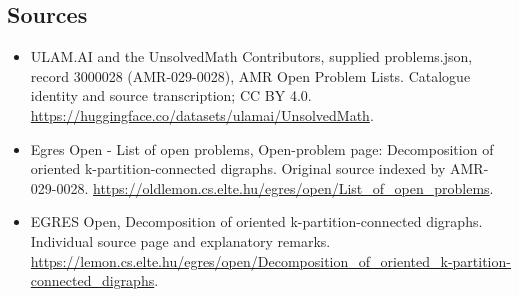 \documentclass[11pt,a4paper]{article}
\begin{document}
\subsection{Sources}
\begin{itemize}
\item[S1] ULAM.AI and the UnsolvedMath Contributors, supplied problems.json, record 3000028 (AMR-029-0028), AMR Open Problem Lists. Catalogue identity and source transcription; CC BY 4.0.
\url{https://huggingface.co/datasets/ulamai/UnsolvedMath}.
\item[S2] Egres Open - List of open problems, Open-problem page: Decomposition of oriented k-partition-connected digraphs. Original source indexed by AMR-029-0028.
\url{https://oldlemon.cs.elte.hu/egres/open/List_of_open_problems}.
\item[S3] EGRES Open, Decomposition of oriented k-partition-connected digraphs. Individual source page and explanatory remarks.
\url{https://lemon.cs.elte.hu/egres/open/Decomposition_of_oriented_k-partition-connected_digraphs}.
\end{itemize}
\end{document}
